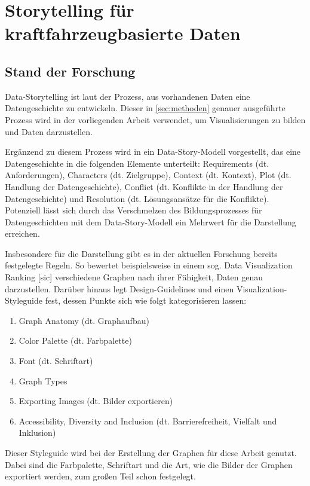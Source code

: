 \chapter{Storytelling für kraftfahrzeugbasierte Daten}
\section{Stand der Forschung}



Data-Storytelling ist laut \cite{Daradkeh.2023} der Prozess, aus vorhandenen Daten eine Datengeschichte zu entwickeln. Dieser in \ref{sec:methoden} genauer ausgeführte Prozess wird in der vorliegenden Arbeit verwendet, um Visualisierungen zu bilden und Daten darzustellen.

Ergänzend zu diesem Prozess wird in \cite{Daradkeh.2023} ein Data-Story-Modell vorgestellt, das eine Datengeschichte in die folgenden Elemente unterteilt: Requirements (dt. Anforderungen), Characters (dt. Zielgruppe), Context (dt. Kontext), Plot (dt. Handlung der Datengeschichte), Conflict (dt. Konflikte in der Handlung der Datengeschichte) und Resolution (dt. Lösungsansätze für die Konflikte). Potenziell lässt sich durch das Verschmelzen des Bildungsprozesses für Datengeschichten mit dem Data-Story-Modell ein Mehrwert für die Darstellung erreichen.

Insbesondere für die Darstellung gibt es in der aktuellen Forschung bereits festgelegte Regeln. So bewertet beispielsweise \cite{Schwabish.2021} in einem sog. \glqq Data Visualization Ranking [sic]\grqq{} verschiedene Graphen nach ihrer Fähigkeit, Daten genau darzustellen. Darüber hinaus legt \cite{Schwabish.2021} Design-Guidelines und einen Visualization-Styleguide fest, dessen Punkte sich wie folgt kategorisieren lassen: 
\begin{enumerate}
    \item Graph Anatomy (dt. Graphaufbau)
    \item Color Palette (dt. Farbpalette)
    \item Font (dt. Schriftart)
    \item Graph Types
    \item Exporting Images (dt. Bilder exportieren)
    \item Accessibility, Diversity and Inclusion (dt. Barrierefreiheit, Vielfalt und Inklusion)
\end{enumerate}

Dieser Styleguide wird bei der Erstellung der Graphen für diese Arbeit genutzt. Dabei sind die Farbpalette, Schriftart und die Art, wie die Bilder der Graphen exportiert werden, zum großen Teil schon festgelegt.

